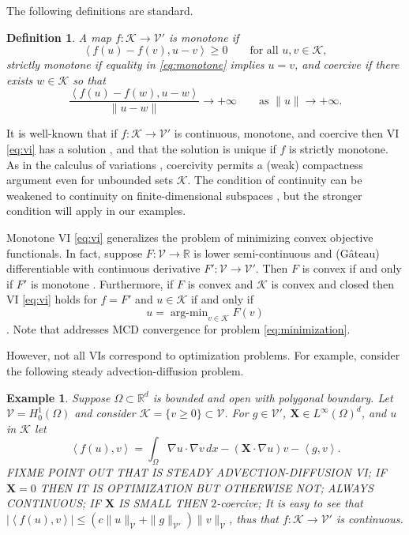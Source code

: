 \documentclass[letterpaper,final,12pt,reqno]{amsart}
\theoremstyle{cstyle}
\theoremstyle{dstyle}
\newtheorem{definition}[theorem]{Definition}
\newtheorem{example}[theorem]{Example}
\numberwithin{equation}{section}
\numberwithin{figure}{section}
\numberwithin{table}{section}
\numberwithin{theorem}{section}
\newcommand{\RR}{\mathbb{R}}
\newcommand{\grad}{\nabla}
\newcommand{\bX}{\mathbf{X}}
\newcommand{\cK}{\mathcal{K}}
\newcommand{\cV}{\mathcal{V}}
\newcommand{\ip}[2]{\left<#1,#2\right>}
\begin{document}
The following definitions \cite{KinderlehrerStampacchia1980} are standard.

\begin{definition} A map $f:\cK \to \cV'$ is \emph{monotone} if
\begin{equation}
\ip{f(u)-f(v)}{u-v} \ge 0 \qquad \text{for all } u,v \in \cK, \label{eq:monotone}
\end{equation}
\emph{strictly monotone} if equality in \eqref{eq:monotone} implies $u=v$, and \emph{coercive} if there exists $w \in \cK$ so that
\begin{equation}
\frac{\ip{f(u)-f(w)}{u-w}}{\|u-w\|} \to +\infty \qquad \text{as } \|u\|\to +\infty.
\end{equation}
\end{definition}

It is well-known that if $f:\cK \to \cV'$ is continuous, monotone, and coercive then VI \eqref{eq:vi} has a solution \cite[Corollary III.1.8]{KinderlehrerStampacchia1980}, and that the solution is unique if $f$ is strictly monotone.  As in the calculus of variations \cite{Evans2010}, coercivity permits a (weak) compactness argument even for unbounded sets $\cK$.  The condition of continuity can be weakened to continuity on finite-dimensional subspaces \cite{KinderlehrerStampacchia1980}, but the stronger condition will apply in our examples.

Monotone VI \eqref{eq:vi} generalizes the problem of minimizing convex objective functionals.  In fact, suppose $F:\cV \to \RR$ is lower semi-continuous and (G\^ateau) differentiable with continuous derivative $F':\cV \to \cV'$.  Then $F$ is convex if and only if $F'$ is monotone \cite[Proposition I.5.5]{EkelandTemam1976}.  Furthermore, if $F$ is convex and $\cK$ is convex and closed then VI \eqref{eq:vi} holds for $f=F'$ and $u\in \cK$ if and only if
\begin{equation}
u = \operatorname{arg-min}_{v\in\cK} F(v) \label{eq:minimization}
\end{equation}
\cite[Proposition II.2.1]{EkelandTemam1976}.  Note that \cite{Tai2003} addresses MCD convergence for problem \eqref{eq:minimization}.

However, not all VIs correspond to optimization problems.  For example, consider the following steady advection-diffusion problem.

\begin{example}  Suppose $\Omega \subset \RR^d$ is bounded and open with polygonal boundary.  Let $\cV = H_0^1(\Omega)$ and consider $\cK = \{v\ge 0\} \subset \cV$.  For $g\in \cV'$, $\bX \in L^\infty(\Omega)^d$, and $u$ in $\cK$ let
\begin{equation}
\ip{f(u)}{v} = \int_\Omega \grad u \cdot \grad v\,dx - (\bX \cdot \grad u) v - \ip{g}{v}. \label{eq:nongradientexample}
\end{equation}
FIXME POINT OUT THAT IS STEADY ADVECTION-DIFFUSION VI; IF $\bX=0$ THEN IT IS OPTIMIZATION BUT OTHERWISE NOT; ALWAYS CONTINUOUS; IF $\bX$ IS SMALL THEN $2$-coercive; It is easy to see that $|\ip{f(u)}{v}| \le (c \|u\|_{\cV} + \|g\|_{\cV'}) \|v\|_{\cV}$, thus that $f:\cK \to \cV'$ is continuous.
\end{example}
\end{document}
